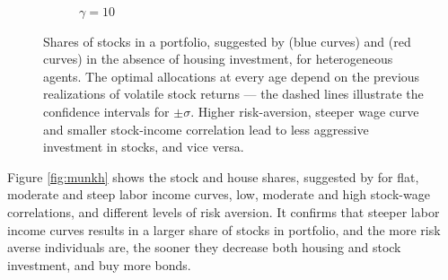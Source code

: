 \begin{figure}[H]
\begin{subfigure}{0.45\textwidth}
		\caption{$\gamma = 10$}
	\end{subfigure}
	\caption{Shares of stocks in a portfolio, suggested by \citet{bodie} (blue curves) and \citet{munk} (red curves) in the absence of housing investment, for heterogeneous agents. The optimal allocations at every age depend on the previous realizations of volatile stock returns --- the dashed lines illustrate the confidence intervals for $\pm \sigma$. Higher risk-aversion, steeper wage curve and smaller stock-income correlation lead to less aggressive investment in stocks, and vice versa. }
	\label{fig:individs}
\end{figure}


Figure \ref{fig:munkh} shows the stock and house shares, suggested by \citet{munk} for flat, moderate and steep labor income curves, low, moderate and high stock-wage correlations, and different levels of risk aversion. It confirms that steeper labor income curves results in a larger share of stocks in portfolio, and the more risk averse individuals are, the sooner they decrease both housing and stock investment, and buy more bonds.

